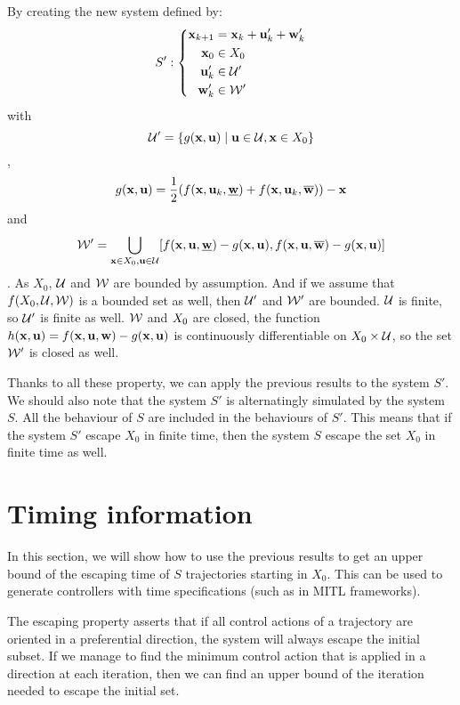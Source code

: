 By creating the new system defined by:
\begin{equation}
S':\left\{
\begin{split}
 \mathbf{x}_{k+1} &=  \mathbf{x}_k +  \mathbf{u}_k' +  \mathbf{w}_k'\\
 \mathbf{x}_0 &\in X_0\\
 \mathbf{u}_k' &\in \mathcal{U}'\\
 \mathbf{w}_k' &\in \mathcal{W}'\\
\end{split}
\right.
\end{equation}
with 
$$\mathcal{U}' = \{ g( \mathbf{x}, \mathbf{u}) \mid  \mathbf{u} \in \mathcal{U},  \mathbf{x} \in X_0\}$$,
$$g( \mathbf{x}, \mathbf{u}) = \frac{1}{2}(f( \mathbf{x}, \mathbf{u}_k,\underline{ \mathbf{w}})+f( \mathbf{x}, \mathbf{u}_k,\overline{ \mathbf{w}})) - \mathbf{x}$$
and 
$$\mathcal{W}' = \bigcup_{ \mathbf{x} \in X_0, \mathbf{u} \in \mathcal{U}} [f( \mathbf{x}, \mathbf{u},\underline{ \mathbf{w}})-g( \mathbf{x}, \mathbf{u}),f( \mathbf{x}, \mathbf{u},\overline{ \mathbf{w}})-g( \mathbf{x}, \mathbf{u})]$$.
As $X_0$, $\mathcal{U}$ and $\mathcal{W}$ are bounded by assumption. And if we assume that $f(X_0,\mathcal{U},\mathcal{W})$ is a bounded set as well, then $\mathcal{U}'$ and $\mathcal{W}'$ are bounded. $\mathcal{U}$ is finite, so $\mathcal{U}'$ is finite as well. $\mathcal{W}$ and $X_0$ are closed, the function $h( \mathbf{x}, \mathbf{u}) = f( \mathbf{x}, \mathbf{u}, \mathbf{w}) - g( \mathbf{x}, \mathbf{u})$ is continuously differentiable on $X_0\times\mathcal{U}$, so the set $\mathcal{W}'$ is closed as well.

Thanks to all these property, we can apply the previous results to the system $S'$. 
We should also note that the system $S'$ is alternatingly simulated by the system $S$. All the behaviour of $S$ are included in the behaviours of $S'$. This means that if the system $S'$ escape $X_0$ in finite time, then the system $S$ escape the set $X_0$ in finite time as well.

\section{Timing  information}\label{sec_timing}
In this section, we will show how to use the previous results to get an upper bound of the escaping time of $S$ trajectories starting in $X_0$.
This can be used to generate controllers with time specifications (such as in MITL frameworks).

The escaping property asserts that if all control actions of a trajectory are oriented in a preferential direction, the system will always escape the initial subset.
If we manage to find the minimum control action that is applied in a direction at each iteration, then we can find an upper bound of the iteration needed to escape the initial set.

